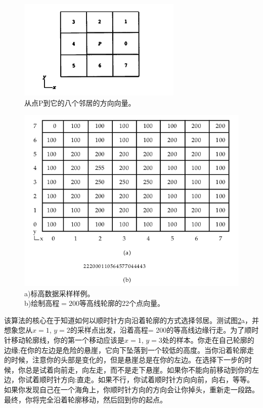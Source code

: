 \begin{CJK}{UTF8}{gbsn}
\begin{figure}[htbp]%
  \centering
  \includegraphics[totalheight=1.8in]{./fig/1.6.1.png}
  \caption{从点P到它的八个邻居的方向向量。} 
  \label{fig:1.6.1}
\end{figure}

\begin{figure}[htbp]%
  \centering
  \includegraphics[totalheight=3in]{./fig/1.6.2.png}
  \caption{a)标高数据采样样例。\\b)绘制$\text{高程}= 200$等高线轮廓的22个点向量。} 
  \label{fig:1.6.2}
\end{figure}

该算法的核心在于知道如何以顺时针方向沿着轮廓的方式选择邻居。测试图\ref{fig:1.6.2}a，并想象您从$x = 1$, $y = 2$的采样点出发，沿着高程= 200的等高线边缘行走。为了顺时针移动轮廓线，你的第一个移动应该是$x = 1$, $y = 3$处的样本。你走在自己轮廓的边缘;在你的左边是危险的悬崖，它向下坠落到一个较低的高度。当你沿着轮廓走的时候，注意你的头部是变化的，但是悬崖总是在你的左边。在选择下一步的时候，你总是试着向前走，向左走，而不是走下悬崖。如果你不能向前移动到你的左边，你试着顺时针方向:直走。如果不行，你试着顺时针方向向前，向右，等等。如果你发现自己在一个海角上，你顺时针方向的方向会让你掉头，重新走一段路。最终，你将完全沿着轮廓移动，然后回到你的起点。


\end{CJK}
